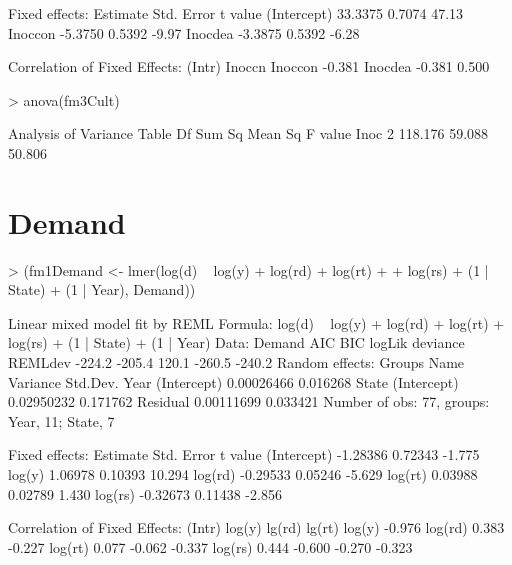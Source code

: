\documentclass[12pt]{article}
\begin{document}
\begin{Schunk}
\begin{Soutput}
Fixed effects:
            Estimate Std. Error t value
(Intercept)  33.3375     0.7074   47.13
Inoccon      -5.3750     0.5392   -9.97
Inocdea      -3.3875     0.5392   -6.28

Correlation of Fixed Effects:
        (Intr) Inoccn
Inoccon -0.381       
Inocdea -0.381  0.500
\end{Soutput}
\begin{Sinput}
> anova(fm3Cult)
\end{Sinput}
\begin{Soutput}
Analysis of Variance Table
     Df  Sum Sq Mean Sq F value
Inoc  2 118.176  59.088  50.806
\end{Soutput}
\end{Schunk}



\section{Demand}
\label{sec:Demand}

\begin{Schunk}
\begin{Sinput}
> (fm1Demand <- lmer(log(d) ~ log(y) + log(rd) + log(rt) + 
+     log(rs) + (1 | State) + (1 | Year), Demand))
\end{Sinput}
\begin{Soutput}
Linear mixed model fit by REML 
Formula: log(d) ~ log(y) + log(rd) + log(rt) + log(rs) + (1 | State) +      (1 | Year) 
   Data: Demand 
    AIC    BIC logLik deviance REMLdev
 -224.2 -205.4  120.1   -260.5  -240.2
Random effects:
 Groups   Name        Variance   Std.Dev.
 Year     (Intercept) 0.00026466 0.016268
 State    (Intercept) 0.02950232 0.171762
 Residual             0.00111699 0.033421
Number of obs: 77, groups: Year, 11; State, 7

Fixed effects:
            Estimate Std. Error t value
(Intercept) -1.28386    0.72343  -1.775
log(y)       1.06978    0.10393  10.294
log(rd)     -0.29533    0.05246  -5.629
log(rt)      0.03988    0.02789   1.430
log(rs)     -0.32673    0.11438  -2.856

Correlation of Fixed Effects:
        (Intr) log(y) lg(rd) lg(rt)
log(y)  -0.976                     
log(rd)  0.383 -0.227              
log(rt)  0.077 -0.062 -0.337       
log(rs)  0.444 -0.600 -0.270 -0.323
\end{Soutput}
\end{Schunk}
\end{document}
